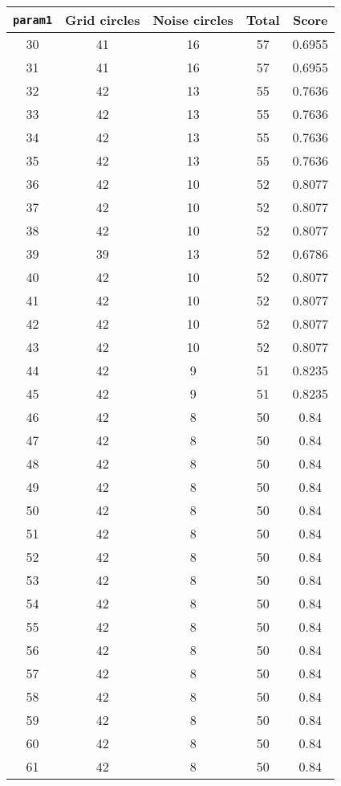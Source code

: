 \documentclass[letterpaper, 12pt]{article}
\begin{document}
\begin{longtable}{|c|c|c|c|c|}
\hline
\textbf{\texttt{param1}} & \textbf{Grid circles} & \textbf{Noise circles} & \textbf{Total} & \textbf{Score} \\
\hline
30 & 41 & 16 & 57 & 0.6955 \\
\hline
31 & 41 & 16 & 57 & 0.6955 \\
\hline
32 & 42 & 13 & 55 & 0.7636 \\
\hline
33 & 42 & 13 & 55 & 0.7636 \\
\hline
34 & 42 & 13 & 55 & 0.7636 \\
\hline
35 & 42 & 13 & 55 & 0.7636 \\
\hline
36 & 42 & 10 & 52 & 0.8077 \\
\hline
37 & 42 & 10 & 52 & 0.8077 \\
\hline
38 & 42 & 10 & 52 & 0.8077 \\
\hline
39 & 39 & 13 & 52 & 0.6786 \\
\hline
40 & 42 & 10 & 52 & 0.8077 \\
\hline
41 & 42 & 10 & 52 & 0.8077 \\
\hline
42 & 42 & 10 & 52 & 0.8077 \\
\hline
43 & 42 & 10 & 52 & 0.8077 \\
\hline
44 & 42 & 9 & 51 & 0.8235 \\
\hline
45 & 42 & 9 & 51 & 0.8235 \\
\hline
46 & 42 & 8 & 50 & 0.84 \\
\hline
47 & 42 & 8 & 50 & 0.84 \\
\hline
48 & 42 & 8 & 50 & 0.84 \\
\hline
49 & 42 & 8 & 50 & 0.84 \\
\hline
50 & 42 & 8 & 50 & 0.84 \\
\hline
51 & 42 & 8 & 50 & 0.84 \\
\hline
52 & 42 & 8 & 50 & 0.84 \\
\hline
53 & 42 & 8 & 50 & 0.84 \\
\hline
54 & 42 & 8 & 50 & 0.84 \\
\hline
55 & 42 & 8 & 50 & 0.84 \\
\hline
56 & 42 & 8 & 50 & 0.84 \\
\hline
57 & 42 & 8 & 50 & 0.84 \\
\hline
58 & 42 & 8 & 50 & 0.84 \\
\hline
59 & 42 & 8 & 50 & 0.84 \\
\hline
60 & 42 & 8 & 50 & 0.84 \\
\hline
61 & 42 & 8 & 50 & 0.84 \\

\end{longtable}
\end{document}
